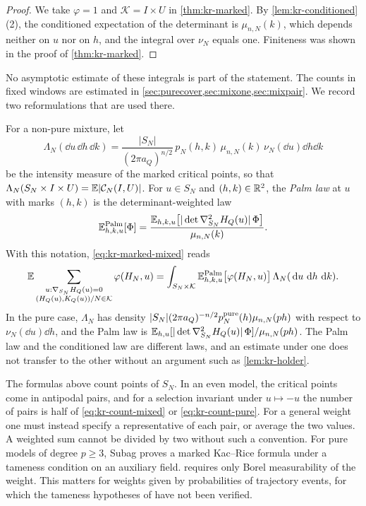 \begin{proof}
We take $\varphi=1$ and $\mathcal K=I\times U$ in \cref{thm:kr-marked}. By \cref{lem:kr-conditioned}(2), the conditioned expectation of the determinant is $\mu_{n,N}(k)$, which depends neither on $u$ nor on $h$, and the integral over $\nu_N$ equals one. Finiteness was shown in the proof of \cref{thm:kr-marked}.
\end{proof}

No asymptotic estimate of these integrals is part of the statement. The counts in fixed windows are estimated in \cref{sec:purecover,sec:mixone,sec:mixpair}. We record two reformulations that are used there.

\begin{remark}\label{rem:kr-palm}
For a non-pure mixture, let
\[
\Lambda_N(\dd u\,\dd h\,\dd k)=\frac{|S_N|}{(2\pi a_Q)^{n/2}}\,p_N(h,k)\,\mu_{n,N}(k)\,\nu_N(\dd u)\dd h\dd k
\]
be the intensity measure of the marked critical points, so that $\Lambda_N(S_N\times I\times U)=\mathbb E|\mathcal C_N(I,U)|$. For $u\in S_N$ and $(h,k)\in\mathbb R^2$, the \emph{Palm law} at $u$ with marks $(h,k)$ is the determinant-weighted law
\[
\mathbb E^{\rm Palm}_{h,k,u}[\Phi]=\frac{\mathbb E_{h,k,u}\big[|\det\nabla^2_{S_N}H_Q(u)|\,\Phi\big]}{\mu_{n,N}(k)}.
\]
With this notation, \eqref{eq:kr-marked-mixed} reads
\[
\mathbb E\sum_{\substack{u:\nabla_{S_N}H_Q(u)=0\\(H_Q(u),K_Q(u))/N\in\mathcal K}}\varphi(H_N,u)=\int_{S_N\times\mathcal K}\mathbb E^{\rm Palm}_{h,k,u}\big[\varphi(H_N,u)\big]\,\Lambda_N(\,\mathrm d u\,\,\mathrm d h\,\,\mathrm d k).
\]
In the pure case, $\Lambda_N$ has density $|S_N|(2\pi a_Q)^{-n/2}p^{\rm pure}_N(h)\mu_{n,N}(ph)$ with respect to $\nu_N(\dd u)\dd h$, and the Palm law is $\mathbb E_{h,u}[|\det\nabla^2_{S_N}H_Q(u)|\,\Phi]/\mu_{n,N}(ph)$. The Palm law and the conditioned law are different laws, and an estimate under one does not transfer to the other without an argument such as \cref{lem:kr-holder}.
\end{remark}

\begin{remark}\label{rem:kr-quotient}
The formulas above count points of $S_N$. In an even model, the critical points come in antipodal pairs, and for a selection invariant under $u\mapsto-u$ the number of pairs is half of \eqref{eq:kr-count-mixed} or \eqref{eq:kr-count-pure}. For a general weight one must instead specify a representative of each pair, or average the two values. A weighted sum cannot be divided by two without such a convention. For pure models of degree $p\ge3$, Subag \cite[Lemma~36]{Subag2017geometry} proves a marked Kac--Rice formula under a tameness condition on an auxiliary field.
 requires only Borel measurability of the weight. This matters for weights given by probabilities of trajectory events, for which the tameness hypotheses of \cite[Lemma~36]{Subag2017geometry} have not been verified.
\end{remark}

